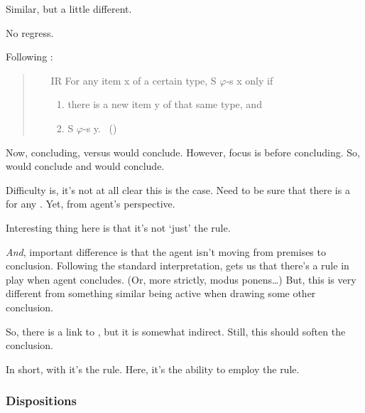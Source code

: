 \begin{note}
  Similar, but a little different.
\end{note}

\begin{note}
  No regress.

  Following \citeauthor{Wieland:2013vf}:

  \begin{quote}
    \begin{itemize}[noitemsep]
    \item[IR]
      For any item x of a certain type, S \(\varphi\)-s x only if
      \begin{enumerate}[label=(\roman*),noitemsep]
      \item
        there is a new item y of that same type, and
      \item
        S \(\varphi\)-s y.%
        \mbox{ }\hfill\mbox{(\citeyear[996]{Wieland:2013vf})}
      \end{enumerate}
    \end{itemize}
  \end{quote}

  Now, concluding, versus would conclude.
  However, focus is before concluding.
  So, would conclude and would conclude.

  Difficulty is, it's not at all clear this is the case.
  Need to be sure that there is a \requ{} for any \requ{}.
  Yet, from agent's perspective.
\end{note}

\begin{note}
  Interesting thing here is that it's not `just' the rule.

  \emph{And}, important difference is that the agent isn't moving from premises to conclusion.
  Following the standard interpretation, \citeauthor{Carroll:1895uj} gets us that there's a rule in play when agent concludes.
  (Or, more strictly, modus ponens\dots)
  But, this is very different from something similar being active when drawing some other conclusion.

  So, there is a link to \citeauthor{Carroll:1895uj}, but it is somewhat indirect.
  Still, this should soften the conclusion.

  In short, with \citeauthor{Carroll:1895uj} it's the rule.
  Here, it's the ability to employ the rule.
\end{note}


\subsubsection{Dispositions}
\label{sec:dispositions}


